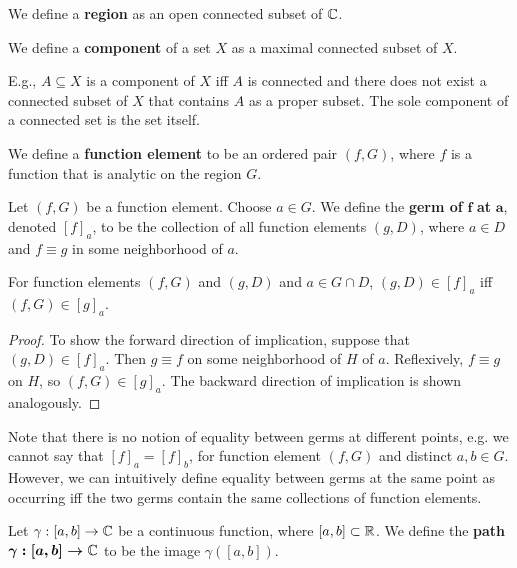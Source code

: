 \documentclass{article}
\begin{document}
\begin{definition}
	We define a \textbf{region} as an open connected subset of $\mathbb{C}$.
\end{definition}

\begin{definition}
	We define a \textbf{component} of a set $X$ as a maximal connected subset of $X$. 
\end{definition}

E.g., $A\subseteq X$ is a component of $X$ iff $A$ is connected and there does not exist a connected subset of $X$ that contains $A$ as a proper subset. The sole component of a connected set is the set itself.

\begin{definition}
	We define a \textbf{function element} to be an ordered pair $(f, G)$, where $f$ is a function that is analytic on the region $G$. 
\end{definition}

\begin{definition}
	Let $(f, G)$ be a function element. Choose $a\in G$. We define the \textbf{germ of} $\boldsymbol f$ \textbf{at} $\boldsymbol a$, denoted $[f]_a$, to be the collection of all function elements $(g, D)$, where $a\in D$ and $f\equiv g$ in some neighborhood of $a$.
\end{definition}

\begin{lemma}
	For function elements $(f, G)$ and $(g, D)$ and $a\in G\cap D$, $(g, D)\in [f]_a$ iff $(f, G)\in [g]_a$.
\end{lemma}

\begin{proof}
	To show the forward direction of implication, suppose that $(g, D)\in [f]_a$. Then $g\equiv f$ on some neighborhood of $H$ of $a$. Reflexively, $f\equiv g$ on $H$, so $(f, G)\in [g]_a$. The backward direction of implication is shown analogously.
\end{proof}

Note that there is no notion of equality between germs at different points, e.g. we cannot say that $[f]_a = [f]_b$, for function element $(f, G)$ and distinct $a, b\in G$. However, we can intuitively define equality between germs at the same point as occurring iff the two germs contain the same collections of function elements.

\begin{definition}
	Let $\gamma:[a, b]\rightarrow\mathbb{C}$ be a continuous function, where $[a, b]\subset\mathbb{R}$. We define the \textbf{path} $\boldsymbol{\gamma:[a, b]\rightarrow\mathbb{C}}$ to be the image $\gamma([a, b])$.
\end{definition}
\end{document}
